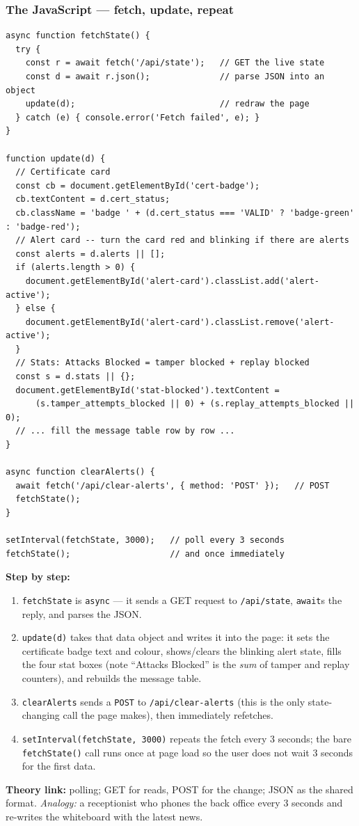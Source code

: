 \documentclass[11pt,a4paper]{article}
\begin{document}
\subsubsection*{The JavaScript --- fetch, update, repeat}
\begin{lstlisting}[style=web,caption={dashboard.html --- the polling JavaScript (core parts).}]
async function fetchState() {
  try {
    const r = await fetch('/api/state');   // GET the live state
    const d = await r.json();              // parse JSON into an object
    update(d);                             // redraw the page
  } catch (e) { console.error('Fetch failed', e); }
}

function update(d) {
  // Certificate card
  const cb = document.getElementById('cert-badge');
  cb.textContent = d.cert_status;
  cb.className = 'badge ' + (d.cert_status === 'VALID' ? 'badge-green' : 'badge-red');
  // Alert card -- turn the card red and blinking if there are alerts
  const alerts = d.alerts || [];
  if (alerts.length > 0) {
    document.getElementById('alert-card').classList.add('alert-active');
  } else {
    document.getElementById('alert-card').classList.remove('alert-active');
  }
  // Stats: Attacks Blocked = tamper blocked + replay blocked
  const s = d.stats || {};
  document.getElementById('stat-blocked').textContent =
      (s.tamper_attempts_blocked || 0) + (s.replay_attempts_blocked || 0);
  // ... fill the message table row by row ...
}

async function clearAlerts() {
  await fetch('/api/clear-alerts', { method: 'POST' });   // POST
  fetchState();
}

setInterval(fetchState, 3000);   // poll every 3 seconds
fetchState();                    // and once immediately
\end{lstlisting}
\textbf{Step by step:}
\begin{enumerate}
  \item \texttt{fetchState} is \texttt{async} --- it sends a GET request to
        \texttt{/api/state}, \texttt{await}s the reply, and parses the JSON.
  \item \texttt{update(d)} takes that data object and writes it into the page:
        it sets the certificate badge text and colour, shows/clears the blinking
        alert state, fills the four stat boxes (note ``Attacks Blocked'' is the
        \emph{sum} of tamper and replay counters), and rebuilds the message
        table.
  \item \texttt{clearAlerts} sends a \texttt{POST} to \texttt{/api/clear-alerts}
        (this is the only state-changing call the page makes), then immediately
        refetches.
  \item \texttt{setInterval(fetchState, 3000)} repeats the fetch every 3 seconds;
        the bare \texttt{fetchState()} call runs once at page load so the user
        does not wait 3 seconds for the first data.
\end{enumerate}
\textbf{Theory link:} polling; GET for reads, POST for the change; JSON as the
shared format. \emph{Analogy:} a receptionist who phones the back office every 3
seconds and re-writes the whiteboard with the latest news.
\end{document}
